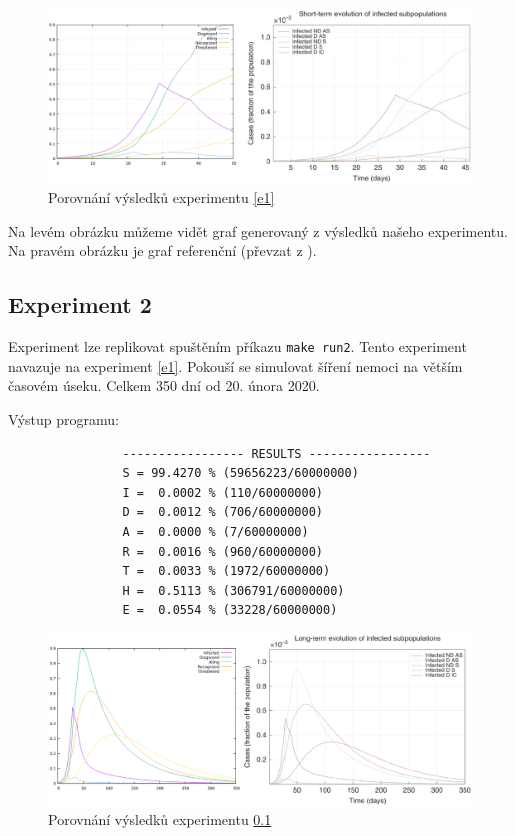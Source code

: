 \documentclass[a4paper,11pt]{article}
\begin{document}
			\begin{figure}[H]
				\caption{Porovnání výsledků experimentu \ref{e1}}
				\label{fig2}
				\centering
				\includegraphics[scale=0.6]{comparison.png}
			\end{figure}
			
			Na levém obrázku můžeme vidět graf generovaný z výsledků našeho experimentu. Na pravém obrázku je graf referenční (převzat z \cite{source}). 
			
		\subsection{Experiment 2}
		\label{e2}
			Experiment lze replikovat spuštěním příkazu \texttt{make run2}.
			Tento experiment navazuje na experiment \ref{e1}. Pokouší se simulovat šíření nemoci na větším časovém úseku. Celkem 350 dní od 20. února 2020.
			
			Výstup programu:
			\begin{verbatim}
				----------------- RESULTS -----------------
				S = 99.4270 % (59656223/60000000)
				I =  0.0002 % (110/60000000)
				D =  0.0012 % (706/60000000)
				A =  0.0000 % (7/60000000)
				R =  0.0016 % (960/60000000)
				T =  0.0033 % (1972/60000000)
				H =  0.5113 % (306791/60000000)
				E =  0.0554 % (33228/60000000)
			\end{verbatim}
		
			\begin{figure}[H]
				\caption{Porovnání výsledků experimentu \ref{e2}}
				\label{fig3}
				\centering
				\includegraphics[scale=0.6]{comparison2.png}
			\end{figure}
		
\end{document}
